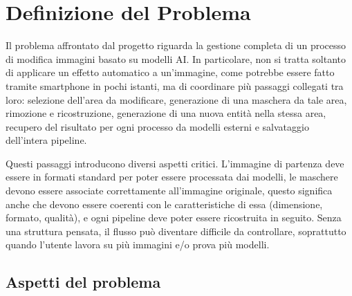 \documentclass[oneside]{supsistudent}
\begin{document}
\chapter{Definizione del Problema}

Il problema affrontato dal progetto riguarda la gestione completa di un
processo di modifica immagini basato su modelli AI.
In particolare, non si tratta soltanto di applicare un effetto automatico
a un'immagine, come potrebbe essere fatto tramite smartphone in pochi istanti, ma
di coordinare più passaggi collegati tra loro: selezione
dell'area da modificare, generazione di una maschera da tale area, rimozione e ricostruzione,
generazione di una nuova entità nella stessa area, recupero del risultato per ogni processo
da modelli esterni e salvataggio dell'intera pipeline.

Questi passaggi introducono diversi aspetti critici.
L'immagine di partenza deve essere in formati standard per poter essere
processata dai modelli, le maschere devono essere associate correttamente
all'immagine originale, questo significa anche che
devono essere coerenti con le caratteristiche di essa (dimensione, formato, qualità),
e ogni pipeline deve poter essere ricostruita in seguito.
Senza una struttura pensata, il flusso può diventare difficile da controllare,
soprattutto quando l'utente lavora su più immagini e/o prova più modelli.

\section{Aspetti del problema}
\end{document}
